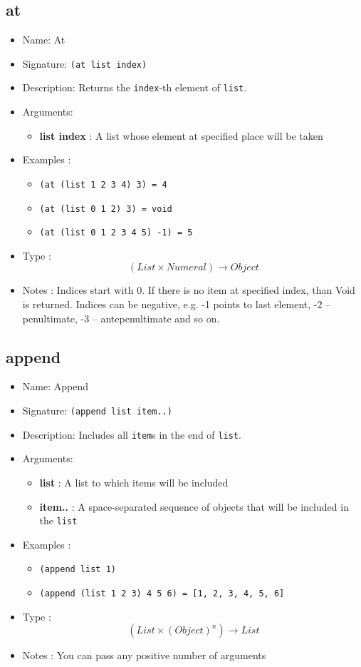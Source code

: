 \subsection{at}
\begin{itemize}
    \item Name: At
    \item Signature: \texttt{(at list index)}
    \item Description: Returns the \texttt{index}-th element of \texttt{list}.
    \item Arguments:
        \begin{itemize}
            \item \textbf{list index} : A list whose element at specified place will be taken
        \end{itemize}
    \item Examples :
        \begin{itemize}
            \item \texttt{(at (list 1 2 3 4) 3) = 4}
            \item \texttt{(at (list 0 1 2) 3) = void}
            \item \texttt{(at (list 0 1 2 3 4 5) -1) = 5}
        \end{itemize}
    \item Type : \[(List \times Numeral) \to Object\]
    \item Notes : Indices start with 0. If there is no item at specified index, than Void is returned. Indices can be negative, e.g. -1 points to last element, -2 -- penultimate, -3 -- antepenultimate and so on.
\end{itemize}

\subsection{append}
\begin{itemize}
    \item Name: Append
    \item Signature: \texttt{(append list item..)}
    \item Description: Includes all \texttt{item}s in the end of \texttt{list}.
    \item Arguments:
        \begin{itemize}
            \item \textbf{list} : A list to which items will be included
            \item \textbf{item..} : A space-separated sequence of objects that will be included in the \texttt{list}
        \end{itemize}
    \item Examples :
        \begin{itemize}
            \item \texttt{(append list 1)}
            \item \texttt{(append (list 1 2 3) 4 5 6) = [1, 2, 3, 4, 5, 6]}
        \end{itemize}
    \item Type : \[(List \times (Object)^n) \to List\]
    \item Notes : You can pass any positive number of arguments
\end{itemize}

